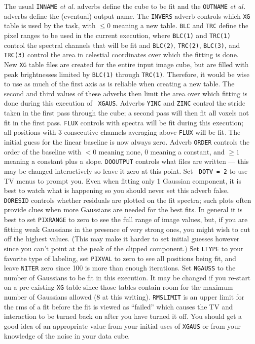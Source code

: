 \documentclass[twoside]{article}
\newcommand{\Hi}[1]{\textcolor{hicol}{#1}}
\begin{document}
The usual {\tt INNAME} {\it et al.} adverbs define the cube to be fit
and the {\tt OUTNAME} {\it et al.} adverbs define the (eventual)
output name.  The {\tt INVERS} adverb controls which {\tt XG} table is
used by the task, with $\leq 0$ meaning a new table.  {\tt BLC} and
{\tt TRC} define the pixel ranges to be used in the current execution,
where {\tt BLC(1)} and {\tt TRC(1)} control the spectral channels that
will be fit and {\tt BLC(2)}, {\tt TRC(2)}, {\tt BLC(3)}, and {\tt
TRC(3)} control the area in celestial coordinates over which the
fitting is done.  \Hi{New {\tt XG} table files are created for the
entire input image cube, but are filled with peak brightnesses limited
by {\tt BLC(1)} through {\tt TRC(1)}\@.  Therefore, it would be wise
to use as much of the first axis as is reliable when creating a new
table.  The second and third values of these adverbs then limit the
area over which fitting is done during this execution of {\tt
  XGAUS}\@.}  Adverbs {\tt YINC} and {\tt ZINC} control the stride
taken in the first pass through the cube; a second pass will then fit
all voxels not fit in the first pass.  {\tt FLUX} controls with
spectra will be fit during this execution; all positions with 3
consecutive channels averaging above {\tt FLUX} will be fit.  The
initial guess for the linear baseline \Hi{is now always zero.  Adverb
  {\tt ORDER} controls the order of the baseline with $<0$ meaning
  none, 0 meaning a constant, and $\ge 1$ meaning a constant plus a
  slope.}  {\tt DOOUTPUT} controls what files are written --- this may
be changed interactively so leave it zero at this point.  Set {\tt
  DOTV = 2} to use TV menus to prompt you.  Even when fitting only 1
Gaussian component, it is best to watch what is happening so you
should never set this adverb false.  {\tt DORESID} controls whether
residuals are plotted on the fit spectra; such plots often provide
clues when more Gaussians are needed for the best fits.  In general it
is best to set {\tt PIXRANGE} to zero to see the full range of image
values, but, if you are fitting weak Gaussians in the presence of very
strong ones, you might wish to cut off the highest values.  (This may
make it harder to set initial guesses however since you can't point at
the peak of the clipped component.)  Set {\tt LTYPE} to your favorite
type of labeling, set {\tt PIXVAL} to zero to see all positions being
fit, and leave {\tt NITER} zero since 100 is more than enough
iterations. Set {\tt NGAUSS} to the number of Gaussians to be fit in
this execution.  It may be changed if you re-start on a pre-existing
{\tt XG} table since those tables contain room for the maximum number
of Gaussians allowed (8 at this writing).  {\tt RMSLIMIT} is an upper
limit for the rms of a fit before the fit is viewed as ``failed''
which causes the TV and interaction to be turned back on after you
have turned it off.  You should get a good idea of an appropriate
value from your initial uses of {\tt XGAUS} or from your knowledge of
the noise in your data cube.
\end{document}
